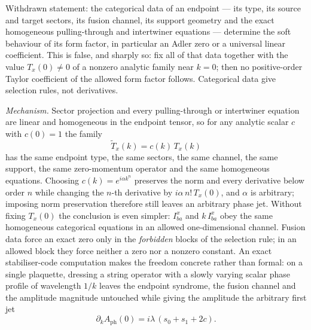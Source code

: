 \begin{refutedclaim}
\label{ref:no-cat-soft}
Withdrawn statement: the categorical data of an endpoint — its type, its
source and target sectors, its fusion channel, its support geometry and the
exact homogeneous pulling-through and intertwiner equations — determine the
soft behaviour of its form factor, in particular an Adler zero or a universal
linear coefficient. This is false, and sharply so: fix all of that data
together with the value $T_x(0) \neq 0$ of a nonzero analytic family near
$k=0$; then no positive-order Taylor coefficient of the allowed form factor
follows. Categorical data give selection rules, not derivatives.
\end{refutedclaim}

\emph{Mechanism.} Sector projection and every pulling-through or intertwiner
equation are linear and homogeneous in the endpoint tensor, so for any analytic
scalar $c$ with $c(0) = 1$ the family
\begin{equation}
  \widetilde T_x(k) = c(k)\,T_x(k)
\end{equation}
has the same endpoint type, the same sectors, the same channel, the same
support, the same zero-momentum operator and the same homogeneous equations.
Choosing $c(k) = e^{i\alpha k^n}$ preserves the norm and every derivative below
order $n$ while changing the $n$-th derivative by $i\alpha\,n!\,T_x(0)$, and
$\alpha$ is arbitrary; imposing norm preservation therefore still leaves an
arbitrary phase jet. Without fixing $T_x(0)$ the conclusion is even simpler:
$I^{x}_{ba}$ and $k\,I^{x}_{ba}$ obey the same homogeneous categorical
equations in an allowed one-dimensional channel. Fusion data force an exact
zero only in the \emph{forbidden} blocks of the selection rule; in an allowed
block they force neither a zero nor a nonzero constant. An exact
stabiliser-code computation makes the freedom concrete rather than formal: on a
single plaquette, dressing a string operator with a slowly varying scalar phase
profile of wavelength $1/k$ leaves the endpoint syndrome, the fusion channel
and the amplitude magnitude untouched while giving the amplitude the arbitrary
first jet
\begin{equation}
  \partial_k A_{\mathrm{ph}}(0) = i\lambda\,(s_0 + s_1 + 2c) .
\end{equation}

